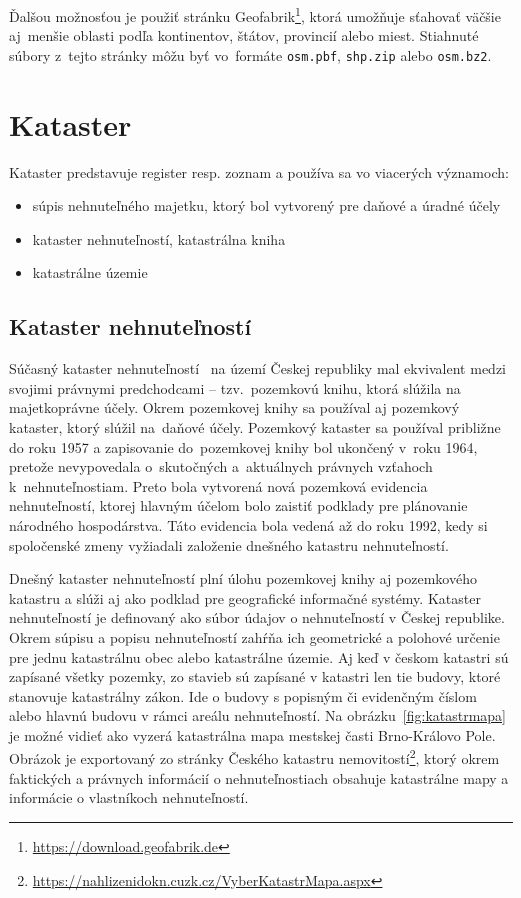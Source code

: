 Ďalšou možnosťou je použiť stránku Geofabrik\footnote{\url{https://download.geofabrik.de}}, ktorá umožňuje sťahovať väčšie aj~menšie oblasti podľa kontinentov, štátov, provincií alebo miest. Stiahnuté súbory z~tejto stránky môžu byť vo~formáte \texttt{osm.pbf}, \texttt{shp.zip} alebo \texttt{osm.bz2}.

\section{Kataster}
Kataster predstavuje register resp. zoznam a používa sa vo viacerých významoch:
\begin{itemize}
    \item súpis nehnuteľného majetku, ktorý bol vytvorený pre daňové a úradné účely
    \item kataster nehnuteľností, katastrálna kniha
    \item katastrálne územie
\end{itemize}

\subsection{Kataster nehnuteľností}
Súčasný kataster nehnuteľností~\cite{baudys-katastranemovitosti} na území Českej republiky mal ekvivalent medzi svojimi právnymi predchodcami \--- tzv.~pozemkovú knihu, ktorá slúžila na majetkoprávne účely. Okrem pozemkovej knihy sa používal aj pozemkový kataster, ktorý slúžil na~daňové účely. Pozemkový kataster sa používal približne do roku 1957 a zapisovanie do~pozemkovej knihy bol ukončený v~roku 1964, pretože nevypovedala o~skutočných a~aktuálnych právnych vzťahoch k~nehnuteľnostiam. Preto bola vytvorená nová pozemková evidencia nehnuteľností, ktorej hlavným účelom bolo zaistiť podklady pre plánovanie národného hospodárstva. Táto evidencia bola vedená až do roku 1992, kedy si spoločenské zmeny vyžiadali založenie dnešného katastru nehnuteľností.

Dnešný kataster nehnuteľností plní úlohu pozemkovej knihy aj pozemkového katastru a slúži aj ako podklad pre geografické informačné systémy. Kataster nehnuteľností je definovaný ako súbor údajov o nehnuteľností v Českej republike. Okrem súpisu a popisu nehnuteľností zahŕňa ich geometrické a polohové určenie pre jednu katastrálnu obec alebo katastrálne územie. Aj keď v českom katastri sú zapísané všetky pozemky, zo stavieb sú zapísané v katastri len tie budovy, ktoré stanovuje katastrálny zákon. Ide o budovy s popisným či evidenčným číslom alebo hlavnú budovu v rámci areálu nehnuteľností. Na obrázku~\ref{fig:katastrmapa} je možné vidieť ako vyzerá katastrálna mapa mestskej časti Brno-Královo Pole. Obrázok je exportovaný zo stránky Českého katastru nemovitostí\footnote{\url{https://nahlizenidokn.cuzk.cz/VyberKatastrMapa.aspx}}, ktorý okrem faktických a právnych informácií o nehnuteľnostiach obsahuje katastrálne mapy a informácie o vlastníkoch nehnuteľností.

